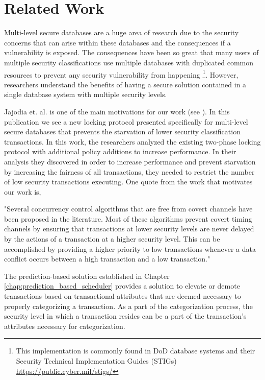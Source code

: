 \section{Related Work}
\label{mls:related_work}

Multi-level secure databases are a huge area of research due to the security concerns that can arise within these databases and the consequences if a vulnerability is exposed. The consequences have been so great that many users of multiple security classifications use multiple databases with duplicated common resources to prevent any security vulnerability from happening \footnote{This implementation is commonly found in DoD database systems and their Security Technical Implementation Guides (STIGs) \hyperlink{https://public.cyber.mil/stigs/}{https://public.cyber.mil/stigs/}}. However, researchers understand the benefits of having a secure solution contained in a single database system with multiple security levels.

Jajodia et. al. is one of the main motivations for our work (see \cite{jajodia_fair_1998}). In this publication we see a new locking protocol presented specifically for multi-level secure databases that prevents the starvation of lower security classification transactions. In this work, the researchers analyzed the existing two-phase locking protocol with additional policy additions to increase performance. In their analysis they discovered in order to increase performance and prevent starvation by increasing the fairness of all transactions, they needed to restrict the number of low security transactions executing. One quote from the work that motivates our work is,

\begin{displayquote}
"Several concurrency control algorithms that are free from covert channels have been proposed in the literature. Most of these algorithms prevent covert timing channels by ensuring that transactions at lower security levels are never delayed by the actions of a transaction at a higher security level. This can be accomplished by providing a higher priority to low transactions whenever a data conflict occurs between a high transaction and a low transaction."
\end{displayquote}

The prediction-based solution established in Chapter \ref{chap:prediction_based_scheduler} provides a solution to elevate or demote transactions based on transactional attributes that are deemed necessary to properly categorizing a transaction. As a part of the categorization process, the security level in which a transaction resides can be a part of the transaction's attributes necessary for categorization.

